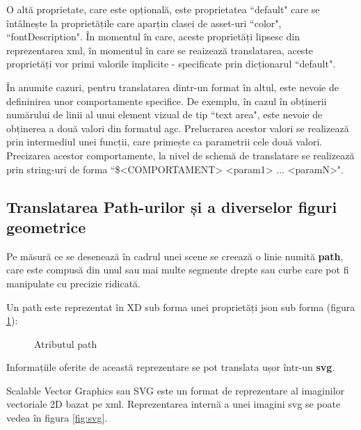  O altă proprietate, care este opțională, este proprietatea ``default" care se întâlnește la proprietățile care aparțin clasei de asset-uri ``color", ``fontDescription". În momentul în care, aceste proprietăți lipsesc din reprezentarea xml, în momentul în care se reaizează translatarea, aceste proprietăți vor primi valorile implicite - specificate prin dicționarul ``default".

 În anumite cazuri, pentru translatarea dintr-un format în altul, este nevoie de defininirea unor comportamente specifice. De exemplu, în cazul în obținerii numărului de linii al unui element vizual de tip ``text area", este nevoie de obținerea a două valori din formatul agc. Prelucrarea acestor valori se realizează prin intermediul unei funcții, care primește ca parametrii cele două valori. 
 Precizarea acestor comportamente, la nivel de schemă de translatare se realizează prin string-uri de forma ``\$<COMPORTAMENT> <param1> ... <paramN>".



\subsection{Translatarea Path-urilor și a diverselor figuri geometrice}

Pe măsură ce se desenează în cadrul unei scene se creează o linie numită \textbf{path}, care este compusă din unul sau mai multe segmente drepte sau curbe care pot fi manipulate cu precizie ridicată.

Un path este reprezentat în XD sub forma unei proprietăți json sub forma (figura \ref{fig:path}):

\begin{figure}[!htbp]
\caption{Atributul path}\label{fig:path}
\end{figure}

Informațiile oferite de această reprezentare se pot translata ușor într-un \textbf{svg}. 

Scalable Vector Graphics sau SVG este un format de reprezentare al imaginilor vectoriale 2D bazat pe xml. Reprezentarea internă a unei imagini svg se poate vedea în figura \ref{fig:svg}.

